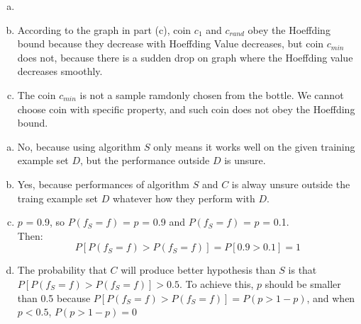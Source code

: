 \documentclass[11pt]{article}
\begin{document}
\begin{enumerate}  [(a)]
\item \
\begin{figure}[htb]        
\end{figure}

\item According to the graph in part (c), coin $c_1$ and $c_{rand}$ obey the Hoeffding bound because they decrease with Hoeffding Value decreases, but coin $c_{min}$ does not, because there is a sudden drop on graph where the Hoeffding value decreases smoothly.

\item The coin $c_{min}$ is not a sample ramdonly chosen from the bottle. We cannot choose coin with specific property, and such coin does not obey the Hoeffding bound.

\end{enumerate}

\newpage
{}
\begin{enumerate} [(a)]
\item No, because using algorithm $S$ only means it works well on the given training example set $D$, but the performance outside $D$ is unsure.

\item Yes, because performances of algorithm $S$ and $C$ is alway unsure outside the traing example set $D$ whatever how they perform with $D$.

\item $p$ = 0.9, so $P(f_S=f)$ = $p$ = 0.9 and $P(f_S=f)$ = $p$ = 0.1.\\
Then:
\[
P[P(f_S=f)>P(f_S=f)]=P[0.9>0.1] = 1
\]

\item The probability that $C$ will produce better hypothesis than $S$ is that $P[P(f_S=f)>P(f_S=f)]>0.5$. To achieve this, $p$ should be smaller than 0.5 because $P[P(f_S=f)>P(f_S=f)]=P(p>1-p)$, and when $p<0.5$, $P(p>1-p)=0$
\end{enumerate}
\end{document}
